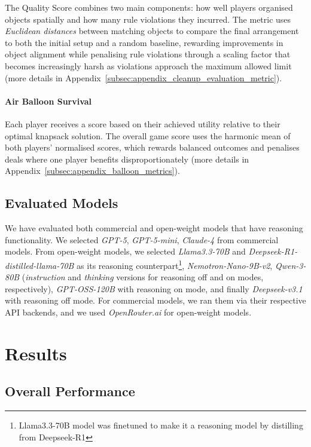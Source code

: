 \documentclass[11pt]{article}
\begin{document}
The Quality Score combines two main components: how well players organised objects spatially and how many rule violations they incurred. The metric uses \textit{Euclidean distances} between matching objects to compare the final arrangement to both the initial setup and a random baseline, rewarding improvements in object alignment while penalising rule violations through a scaling factor that becomes increasingly harsh as violations approach the maximum allowed limit 
(more details in Appendix~\ref{subsec:appendix_cleanup_evaluation_metric}).



\paragraph{Air Balloon Survival}

Each player receives a score based on their achieved utility relative to their optimal knapsack solution. The overall game score uses the harmonic mean of both players' normalised scores, which rewards balanced outcomes and penalises deals where one player benefits disproportionately (more details in Appendix~\ref{subsec:appendix_balloon_metrics}).

\subsection{Evaluated Models}

We have evaluated both commercial and open-weight models that have reasoning functionality. We selected \textit{GPT-5}, \textit{GPT-5-mini}, \textit{Claude-4} from commercial models. From open-weight models, we selected \textit{Llama3.3-70B} and \textit{Deepseek-R1-distilled-llama-70B} as its reasoning counterpart\footnote{Llama3.3-70B model was finetuned to make it a reasoning model by distilling from Deepseek-R1}, \textit{Nemotron-Nano-9B-v2}, \textit{Qwen-3-80B} (\textit{instruction} and \textit{thinking} versions for reasoning off and on modes, respectively), \textit{GPT-OSS-120B} with reasoning on mode, and finally \textit{Deepseek-v3.1} with reasoning off mode. For commercial models, we ran them via their respective API backends, and we used \textit{OpenRouter.ai} for open-weight models.


\section{Results}

\subsection{Overall Performance}
\end{document}
